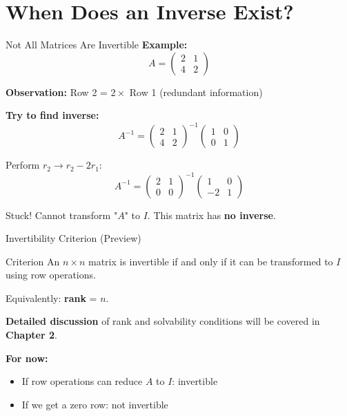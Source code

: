 \documentclass[10pt]{beamer}
\theoremstyle{definition}
\newcommand{\x}[1]{\alert{\textbf{#1}}}
\begin{document}

\section{When Does an Inverse Exist?}

\begin{frame}{Not All Matrices Are Invertible}
\textbf{Example:}
$$A = \begin{pmatrix} 2 & 1 \\ 4 & 2 \end{pmatrix}$$

\textbf{Observation:} Row 2 = $2 \times$ Row 1 (redundant information)

\vspace{0.3cm}
\textbf{Try to find inverse:}
$$A^{-1} = \begin{pmatrix} 2 & 1 \\ 4 & 2 \end{pmatrix}^{-1} \begin{pmatrix} 1 & 0 \\ 0 & 1 \end{pmatrix}$$

Perform $r_2 \to r_2 - 2r_1$:
$$A^{-1} = \begin{pmatrix} 2 & 1 \\ 0 & 0 \end{pmatrix}^{-1} \begin{pmatrix} 1 & 0 \\ -2 & 1 \end{pmatrix}$$

\begin{alertblock}{Stuck!}
Cannot transform "$A$" to $I$. This matrix has \x{no inverse}.
\end{alertblock}
\end{frame}

\begin{frame}{Invertibility Criterion (Preview)}
\begin{block}{Criterion}
An $n \times n$ matrix is invertible if and only if it can be transformed to $I$ using row operations.

Equivalently: \x{rank} = $n$.
\end{block}

\vspace{0.5cm}
\textbf{Detailed discussion} of rank and solvability conditions will be covered in \x{Chapter 2}.

\vspace{0.5cm}
\textbf{For now:}
\begin{itemize}
\item If row operations can reduce $A$ to $I$: invertible
\item If we get a zero row: not invertible
\end{itemize}
\end{frame}
\end{document}
